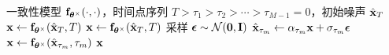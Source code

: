 \begin{algorithm}[thb!]
    {\small
        \caption{CM 的单步或多步生成采样 \label{alg:cm_sampling}}
    \begin{algorithmic}[1]
        \Require 一致性模型 ${\mathbf{f}}_{\bm{\theta}^\times}(\cdot, \cdot)$，时间点序列 $T>\tau_1 > \tau_2 > \cdots > \tau_{M-1}=0$，初始噪声 $\hat{{\mathbf{x}}}_T$
            \State ${\mathbf{x}} \leftarrow {\mathbf{f}}_{\bm{\theta}^\times}(\hat{{\mathbf{x}}}_T, T)$
        \Else
            \State ${\mathbf{x}} \leftarrow {\mathbf{f}}_{\bm{\theta}^\times}(\hat{{\mathbf{x}}}_T, T)$
                \State 采样 $\bm{\epsilon} \sim \mathcal{N}(\bm{0}, \mathbf{I})$
                \State $\hat{{\mathbf{x}}}_{\tau_m} \leftarrow \alpha_{\tau_m}{\mathbf{x}} + \sigma_{\tau_m} \bm{\epsilon}$
                \State ${\mathbf{x}} \leftarrow {\mathbf{f}}_{\bm{\theta}^\times}(\hat{{\mathbf{x}}}_{\tau_m}, \tau_m)$
            \EndFor
        \EndIf
        \Ensure ${\mathbf{x}}$
    \end{algorithmic}
    }
\end{algorithm}















